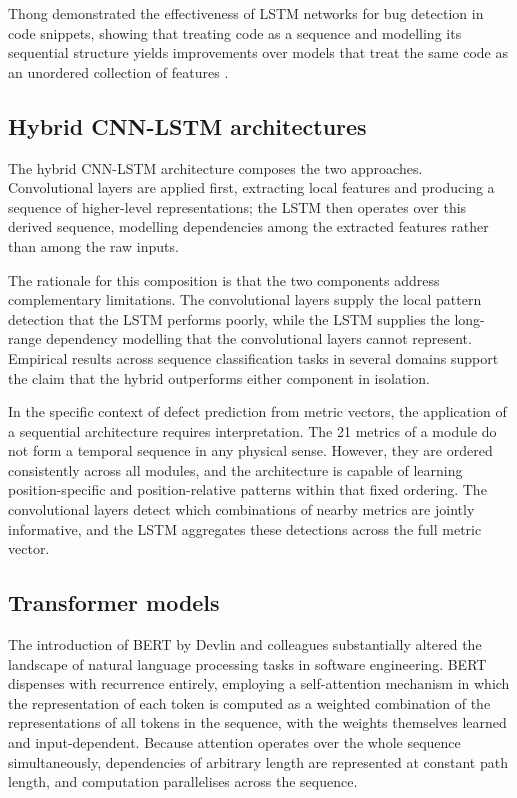 \documentclass[12pt,a4paper,oneside]{report}
\begin{document}
Thong demonstrated the effectiveness of LSTM networks for bug detection in code snippets, showing that treating code as a sequence and modelling its sequential structure yields improvements over models that treat the same code as an unordered collection of features \cite{thong2018}.

\subsection{Hybrid CNN-LSTM architectures}

The hybrid CNN-LSTM architecture composes the two approaches. Convolutional layers are applied first, extracting local features and producing a sequence of higher-level representations; the LSTM then operates over this derived sequence, modelling dependencies among the extracted features rather than among the raw inputs.

The rationale for this composition is that the two components address complementary limitations. The convolutional layers supply the local pattern detection that the LSTM performs poorly, while the LSTM supplies the long-range dependency modelling that the convolutional layers cannot represent. Empirical results across sequence classification tasks in several domains support the claim that the hybrid outperforms either component in isolation.

In the specific context of defect prediction from metric vectors, the application of a sequential architecture requires interpretation. The 21 metrics of a module do not form a temporal sequence in any physical sense. However, they are ordered consistently across all modules, and the architecture is capable of learning position-specific and position-relative patterns within that fixed ordering. The convolutional layers detect which combinations of nearby metrics are jointly informative, and the LSTM aggregates these detections across the full metric vector.

\subsection{Transformer models}

The introduction of BERT by Devlin and colleagues \cite{devlin2019} substantially altered the landscape of natural language processing tasks in software engineering. BERT dispenses with recurrence entirely, employing a self-attention mechanism in which the representation of each token is computed as a weighted combination of the representations of all tokens in the sequence, with the weights themselves learned and input-dependent. Because attention operates over the whole sequence simultaneously, dependencies of arbitrary length are represented at constant path length, and computation parallelises across the sequence.
\end{document}
